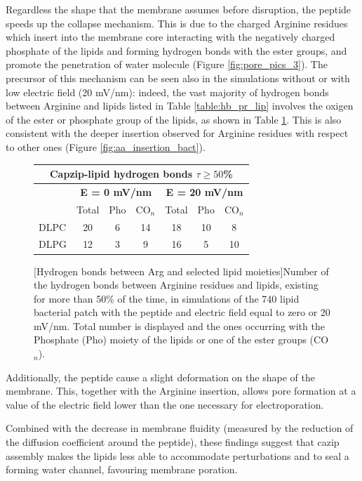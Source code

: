 Regardless the shape that the membrane assumes before disruption, the peptide speeds up the collapse mechanism. This is due to the charged Arginine residues which insert into the membrane core interacting with the negatively charged phosphate of the lipids and forming hydrogen bonds with the ester groups, and promote the penetration of water molecule (Figure \ref{fig:pore_pics_3}).
%
The precursor of this mechanism can be seen also in the simulations without or with low electric field (20 mV/nm): indeed, the vast majority of hydrogen bonds between Arginine and lipids listed in Table \ref{table:hb_pr_lip} involves the oxigen of the ester or phosphate group of the lipids, as shown in Table \ref{table:hb_ester}. This is also consistent with the deeper insertion observed for Arginine residues with respect to other ones (Figure \ref{fig:aa_insertion_bact}).

\begin{figure}[t!]
\centering
 \def\arraystretch{1.6}
\begin{tabular}{l|ccc|ccc}
\multicolumn{7}{c}{\textbf{Capzip-lipid hydrogen bonds $\tau \ge 50$}\%} \\
\hline
& \multicolumn{3}{c|}{\textbf{E = 0 mV/nm}} & \multicolumn{3}{c}{\textbf{E = 20 mV/nm}} \\
\hline
& Total & Pho & CO$_n$ & Total & Pho & CO$_n$ \\ 
\hline
DLPC & 20 & 6 & 14 & 18 & 10 & 8 \\
DLPG &12 & 3 & 9 & 16 & 5 & 10 \\
\hline
 \end{tabular}
[Hydrogen bonds between Arg and selected lipid moieties]{Number of the hydrogen bonds between Arginine residues and lipids, existing for more than 50\% of the time, in simulations of the 740 lipid bacterial patch with the peptide and electric field equal to zero or 20 mV/nm. Total number is displayed and the ones occurring with the Phosphate (Pho) moiety of the lipids or one of the ester groups (CO$_n$).}
\label{table:hb_ester}
\end{figure}

Additionally, the peptide cause a slight deformation on the shape of the membrane. This, together with the Arginine insertion, allows pore formation at a value of the electric field lower than the one necessary for electroporation.

Combined with the decrease in membrane fluidity (measured by the reduction of the diffusion coefficient around the peptide), these findings suggest that cazip assembly makes the lipids less able to accommodate perturbations and to seal a forming water channel, favouring membrane poration.



